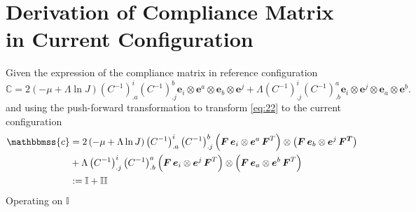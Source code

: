 \section{Derivation of Compliance Matrix in Current Configuration}
Given the expression of the compliance matrix in reference configuration
\begin{equation}\label{eq:22}
    \mathbb{C} = 2\left(-\mu + \Lambda\ln{J}\right)\left(C^{-1}\right)^i_{.a} \left(C^{-1}\right)^b_{.j} \boldsymbol{e}_{i} \otimes \boldsymbol{e}^{a} \otimes \boldsymbol{e}_{b} \otimes \boldsymbol{e}^{j}
    + \Lambda \left(C^{-1}\right)^i_{.j} \left(C^{-1}\right)^a_{.b} \boldsymbol{e}_{i} \otimes \boldsymbol{e}^{j} \otimes \boldsymbol{e}_{a} \otimes \boldsymbol{e}^{b}.
\end{equation}
\normalsize and using the push-forward transformation to transform \eqref{eq:22} to the current configuration
\begin{equation}
    \begin{split}
    \mathbbmss{c} &= 2\left(-\mu + \Lambda\ln{J}\right)\left(C^{-1}\right)^i_{.a} \left(C^{-1}\right)^b_{.j} 
    \left(\boldsymbol{F\, e}_i \otimes \boldsymbol{e}^a \, \boldsymbol{F}^T\right) \otimes \left(\boldsymbol{F\,e}_b \otimes \boldsymbol{e}^j \,\boldsymbol{F^T}\right)\\
    &+ \Lambda \left(C^{-1}\right)^i_{.j} \left(C^{-1}\right)^a_{.b} \left(\boldsymbol{F\,e}_i \otimes \boldsymbol{e}^j \,\boldsymbol{F}^T\right) \otimes \left(\boldsymbol{F\,e}_a \otimes \boldsymbol{e}^b\, \boldsymbol{F}^T\right)\\
    &:= \mathbb{I} + \mathbb{II}
    \end{split}
\end{equation}
\normalsize Operating on $\mathbb{I}$
